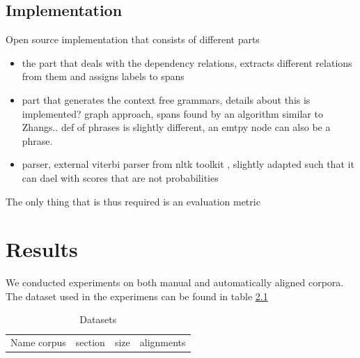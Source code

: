 \documentclass{report}
\theoremstyle{indented}
\begin{document}
\section{Implementation}

Open source implementation that consists of different parts

\begin{itemize}
\item the part that deals with the dependency relations, extracts different relations from them and assigns labels to spans
\item part that generates the context free grammars, details about this is implemented? graph approach, spans found by an algorithm similar to Zhangs.. def of phrases is slightly different, an emtpy node can also be a phrase.
\item parser, external viterbi parser from nltk toolkit \citep{bird2009natural}, slightly adapted such that it can dael with scores that are not probabilities 
\end{itemize}

The only thing that is thus required is an evaluation metric


\chapter{Results}


We conducted experiments on both manual and automatically aligned corpora. The dataset used in the experimens can be found in table \ref{table:datasets}

\begin{table}\label{table:datasets}
\begin{tabular}{cccc}
Name corpus & section & size & alignments\\
\end{tabular}
\caption{Datasets}
\end{table}
\end{document}
